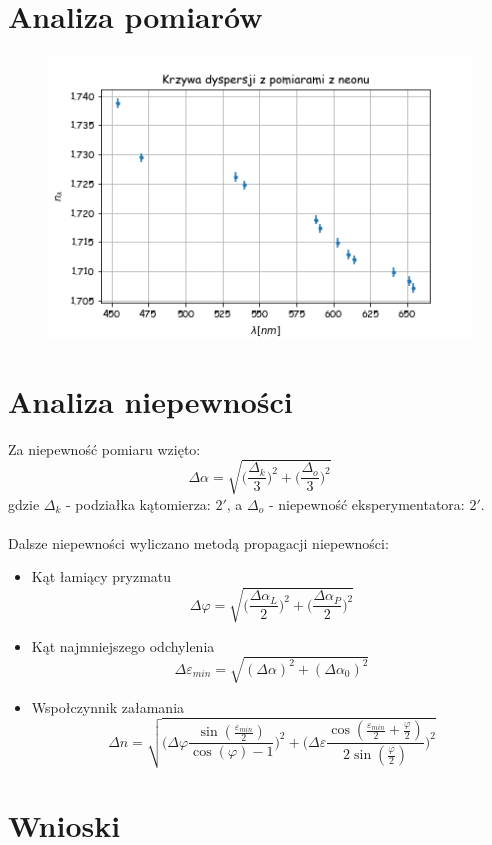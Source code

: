 \documentclass[a4paper,10pt]{article}
\begin{document}
\section{Analiza pomiarów}
\begin{figure} [H]
  \includegraphics{./dyspersja.png}
  \caption{}
  \label{}
\end{figure}

\section{Analiza niepewności}
Za niepewność pomiaru wzięto:
\begin{equation}
  \Delta \alpha = \sqrt{\bigg(\frac{\Delta_k}{3}\bigg)^2+\bigg(\frac{\Delta_o}{3}\bigg)^2}
\end{equation}
gdzie $\Delta_k$ - podziałka kątomierza: $2'$, a $\Delta_o$ - niepewność eksperymentatora: $2'$.\\
\\Dalsze niepewności wyliczano metodą propagacji niepewności:
\begin{itemize}
  \item Kąt łamiący pryzmatu
  \begin{equation}
    \Delta \varphi = \sqrt{\bigg(\frac{\Delta \alpha_L}{2}\bigg)^2+\bigg(\frac{\Delta \alpha_P}{2}\bigg)^2}
  \end{equation}
  \item Kąt najmniejszego odchylenia
  \begin{equation}
    \Delta \varepsilon_{min} = \sqrt{(\Delta \alpha)^2+(\Delta \alpha_0)^2}
  \end{equation}
  \item Wspołczynnik załamania
  \begin{equation}
    \Delta n = \sqrt{\bigg(\Delta \varphi \frac{\sin{\left (\frac{\varepsilon_{min}}{2} \right )}}{\cos{\left (\varphi \right )} - 1}\bigg)^2+
    \bigg(\Delta \varepsilon \frac{\cos{\left (\frac{\varepsilon_{min}}{2} + \frac{\varphi}{2} \right )}}{2 \sin{\left (\frac{\varphi}{2} \right )}}\bigg)^2}
  \end{equation}
\end{itemize}

\section{Wnioski}
\end{document}
